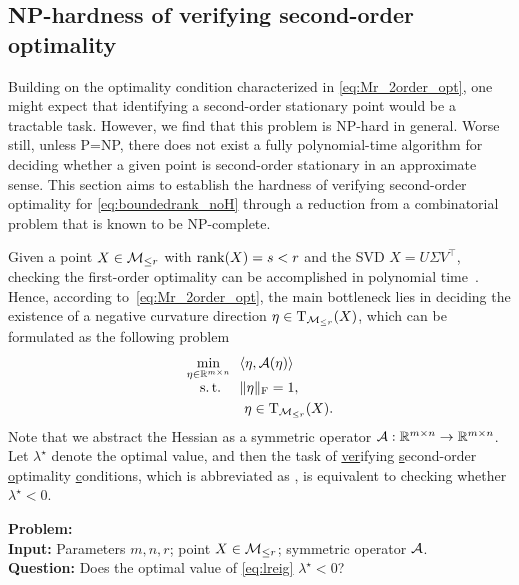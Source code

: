 \subsection{{NP-hardness} of verifying second-order optimality}\label{sec:NP_versec}
Building on the optimality condition characterized in \eqref{eq:Mr_2order_opt}, one might expect that identifying a second-order stationary point would be a tractable task. However, we find that this problem is NP-hard in general. Worse still, unless P=NP, there does not exist a fully polynomial-time algorithm for deciding whether a given point is second-order stationary in an approximate sense. This section aims to establish the hardness of verifying second-order optimality for \eqref{eq:boundedrank_noH} through a reduction from a combinatorial problem that is known to be NP-complete.

Given a point $X\in\mathcal{M}_{\le r}$ with $\operatorname{rank}(X)=s<r$ and the SVD $X=U\varSigma V^\top$, checking the first-order optimality can be accomplished in polynomial time~\cite{cason2013iterative,schneider2015Lojaconvergence}. Hence, according to~\eqref{eq:Mr_2order_opt}, the main bottleneck lies in deciding the existence of a negative curvature direction $\eta\in\mathrm{T}_{\mathcal{M}_{\le r}}(X)$, which can be formulated as the following problem
\begin{equation}\label{eq:lreig}
\begin{aligned}
    \min_{\eta\in\mathbb{R}^{m\times n}}\ \ & \langle {\eta,\mathcal{A}(\eta)} \rangle
    \\[-1.5mm]
    \mathrm{s.\,t.}\ \ \ \ & \|\eta\|_{\mathrm{F}} = 1,
    \\
    &\ \eta\in\mathrm{T}_{\mathcal{M}_{\le r}}(X).
    \end{aligned}
\end{equation}
Note that we abstract the Hessian as a symmetric operator $\mathcal{A}:\mathbb{R}^{m\times n}\to\mathbb{R}^{m\times n}$. Let $\lambda^\star$ denote the optimal value, and then the task of \underline{ver}ifying \underline{s}econd-order \underline{o}ptimality \underline{c}onditions, which is abbreviated as \verifysec, is equivalent to checking whether $\lambda^\star<0$.
\begin{tcolorbox}[
colframe=black,
colback=white,
boxrule=0.5pt,    %
arc=2mm,          %
left=2mm, right=2mm, top=2mm, bottom=2mm %
]
\textbf{Problem:} \verifysec
\\
\textbf{Input:} Parameters $m,n,r$; point $X\in\mathcal{M}_{\le r}$; symmetric operator $\mathcal{A}$.
\\
\textbf{Question:} Does the optimal value of \eqref{eq:lreig} $\lambda^\star<0$?
\end{tcolorbox}

